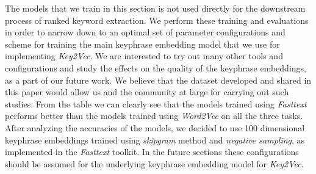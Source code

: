 \documentclass[conference]{IEEEtran}
\begin{document}
\begin{table}[htbp]
\centering
\footnotesize
\captionsetup{justification=centering}
\caption{\small Accuracies of keyphrase embedding models for phrase-sentence similarity task.}
\label{sentence-phrase}
\tabcolsep=0.10cm
\end{table}

The models that we train in this section is not used directly for the downstream process of ranked keyword extraction. We perform these training and evaluations in order to narrow down to an optimal set of parameter configurations and scheme for training the main keyphrase embedding model that we use for implementing \textit{Key2Vec}. We are interested to try out many other tools and configurations and study the effects on the quality of the keyphrase embeddings, as a part of our future work. We believe that the dataset developed and shared in this paper would allow us and the community at large for carrying out such studies. From the table we can clearly see that the models trained using \textit{Fasttext} performs better than the models trained using \textit{Word2Vec} on all the three tasks. After analyzing the accuracies of the models, we decided to use 100 dimensional keyphrase embeddings trained using \textit{skipgram} method and \textit{negative sampling}, as implemented in the \textit{Fasttext} toolkit. In the future sections these configurations should be assumed for the underlying keyphrase embedding model for \textit{Key2Vec}. 
\end{document}
